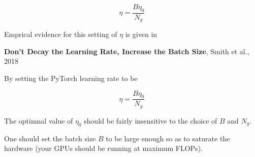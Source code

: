 {

{\color{red} $$\eta = \frac{B\eta_0}{N_g}$$}

\vfill
Emprical evidence for this setting of $\eta$ is given in

\vfill
{\bf Don't Decay the Learning Rate, Increase the Batch Size}, Smith et al., 2018


By setting the PyTorch learning rate to be

{\color{red} $$\eta = \frac{B\eta_0}{N_g}$$}

\vfill
The optimnal value of $\eta_0$ should be fairly insensitive to the choice of $B$ and $N_g$.

\vfill
One should set the batch size $B$ to be large enough so as to saturate the hardware (your GPUs should be running at maximum FLOPs).


} 

